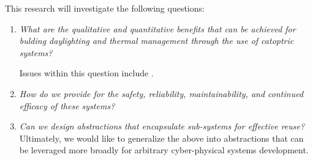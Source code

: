 This research will investigate the following questions:
\begin{enumerate}

\item \emph{What are the qualitative and quantitative benefits
that can be achieved for bulding daylighting and thermal management
through the use of catoptric systems?}

Issues within this question include .

\item \emph{How do we provide for the safety, reliability, maintainability, and
continued efficacy of these systems?}

\item \emph{Can we design abstractions that encapsulate sub-systems for
effective reuse?}
Ultimately, we would like to generalize the above into abstractions that can be
leveraged more broadly for arbitrary cyber-physical systems development.

\end{enumerate}

